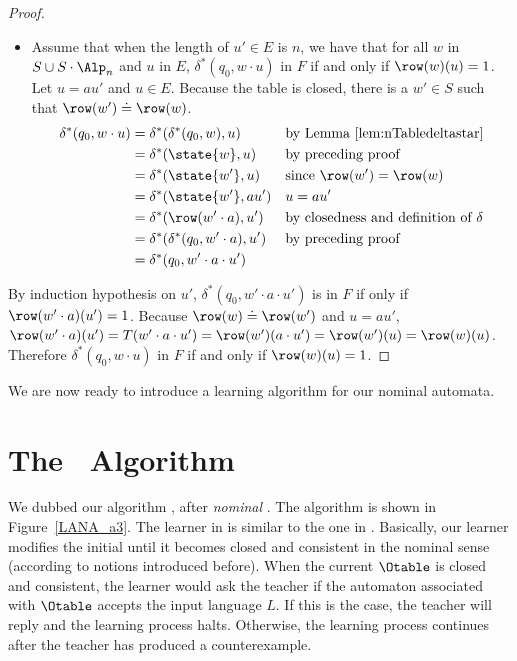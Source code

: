 \begin{proof}
\begin{itemize}
  \item{Assume that when the length of $u'\in E$ is $n$, we have that for all $w$ in $S\cup S\cdot {\Alp_n}$ and $u$ in $E$, $\delta^\ast(q_0,w\cdot u)$ in $F$ if and only if $\row(w)(u)=1$. Let $u=au'$ and $u\in E$. Because the table is closed, there is a $w'\in S$ such that $\row(w')\doteq\row(w)$.
      \begin{align*}
        \delta^\ast(q_0,w\cdot u)
        &=\delta^\ast(\delta^\ast(q_0,w), u) && \textrm{by Lemma~\ref{lem:nTabledeltastar}}\\
        &=\delta^\ast(\state{w}, u) && \textrm{by preceding proof}\\
        &=\delta^\ast(\state{w'},u) && \textrm{since $\row(w')=\row(w)$}\\
        &=\delta^\ast(\state{w'},au') && \textrm{$u=au'$}\\
        &=\delta^\ast(\row(w'\cdot a),u') && \textrm{by closedness and definition of $\delta$}\\
        &=\delta^\ast(\delta^\ast(q_0,w'\cdot a),u')&& \textrm{by preceding proof}\\
        &=\delta^\ast(q_0,w'\cdot a\cdot u')
      \end{align*}
    }
  \end{itemize}
  By induction hypothesis on $u'$, $\delta^\ast(q_0,w'\cdot a\cdot
  u')$ is in $F$ if only if $\row(w'\cdot a)(
  u')=1$. Because $\row(w)\doteq \row(w')$ and $u=au'$, $\row(w'\cdot
  a)( u')=T(w'\cdot a\cdot u')=\row(w')( a\cdot
  u')=\row(w')(u)=\row(w)(u)$. Therefore $\delta^\ast(q_0,w\cdot
  u)$ in $F$ if and only if $\row(w)(u)=1$.
\end{proof}


We are now ready to introduce a learning algorithm for our nominal
automata.

\section{The \nlstar\ Algorithm}
%
We dubbed our algorithm \nlstar, after \emph{nominal} \lstar.
%
The algorithm is shown in Figure~\ref{LANA_a3}.
%
The learner in \nlstar is similar to the one in \lstar.
%
Basically, our learner modifies the initial \nOtable until it becomes
closed and consistent in the nominal sense (according to notions
introduced before).
%
When the current \nOtable $\Otable$ is closed and consistent, the
learner would ask the teacher if the automaton associated with $\Otable$
accepts the input language $L$.
%
If this is the case, the teacher will reply  and the learning process halts.
%
Otherwise, the learning process continues after the teacher has
produced a counterexample.

